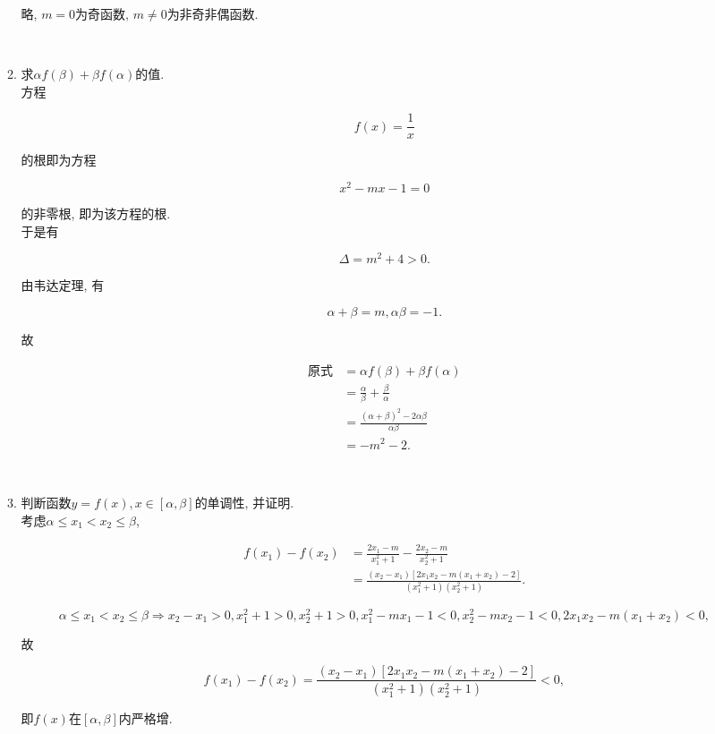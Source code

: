 \documentclass[8pt]{article}
\begin{document}
\begin{enumerate}[label=\arabic*.]
\begin{enumerate}[label=(\arabic*)]
					略, $m=0$为奇函数, $m\neq 0$为非奇非偶函数.

				~\\

				\item 求$\alpha f(\beta) + \beta f(\alpha)$的值.
					~\\

					方程

					$$f(x)=\frac{1}{x}$$

					的根即为方程

					$$x^2 - mx - 1 = 0$$

					的非零根, 即为该方程的根.
					~\\

					于是有

					$$\Delta = m^2 + 4 > 0.$$

					由韦达定理, 有

					$$\alpha + \beta = m, \alpha \beta = -1.$$

					故

					\begin{align*}
						\text{原式} &= \alpha f(\beta) + \beta f(\alpha)\\
						&= \frac{\alpha}{\beta} + \frac{\beta}{\alpha}\\
						&= \frac{(\alpha + \beta)^2 - 2\alpha \beta}{\alpha \beta}\\
						&= -m^2 - 2.
					\end{align*}

				~\\

				\item 判断函数$y=f(x), x\in[\alpha, \beta]$的单调性, 并证明.
					~\\

					考虑$\alpha \leq x_1 < x_2 \leq \beta$,

					\begin{align*}
						f(x_1) - f(x_2) &= \frac{2x_1 - m}{x_1^2 + 1} - \frac{2x_2 - m}{x_2^2 + 1}\\
						&= \frac{(x_2 - x_1)[2x_1 x_2 - m(x_1 + x_2) - 2]}{(x_1^2 + 1)(x_2^2 + 1)}.
					\end{align*}

					$$\alpha \leq x_1 < x_2 \leq \beta \Rightarrow x_2 - x_1 > 0, x_1^2 + 1 > 0, x_2^2 + 1 > 0, x_1^2 - mx_1 - 1 < 0, x_2^2 - mx_2 - 1 < 0, 2x_1 x_2 - m(x_1 + x_2) < 0,$$

					故

					$$f(x_1) - f(x_2) = \frac{(x_2 - x_1)[2x_1 x_2 - m(x_1 + x_2) - 2]}{(x_1^2 + 1)(x_2^2 + 1)} < 0,$$

					即$f(x)$在$[\alpha, \beta]$内严格增.

			\end{enumerate}

	\end{enumerate}
\end{document}
